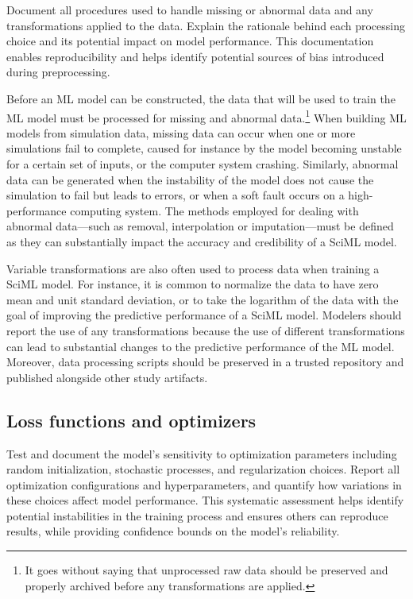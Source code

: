 \begin{essrec}
Document all procedures used to handle missing or abnormal data and any transformations applied to the data. Explain the rationale behind each processing choice and its potential impact on model performance. This documentation enables reproducibility and helps identify potential sources of bias introduced during preprocessing.
\end{essrec}

Before an ML model can be constructed, the data that will be used to train the ML model must be processed for missing and abnormal data.\footnote{It goes without saying that unprocessed raw data should be preserved and properly archived before any transformations are applied.} 
When building ML models from simulation data, missing data can occur when one or more simulations fail to complete, caused for instance by the model becoming unstable for a certain set of inputs, or the computer system crashing. Similarly, abnormal data can be generated when the instability of the model does not cause the simulation to fail but leads to errors, or when a soft fault occurs on a high-performance computing system.
The methods employed for dealing with abnormal data---such as removal, interpolation or imputation---must be defined as they can substantially impact the accuracy and credibility of a SciML model. 

Variable transformations are also often used to process data when training a SciML model. For instance, it is common to normalize the data to have zero mean and unit standard deviation, or to take the logarithm of the data with the goal of improving the predictive performance of a SciML model.
Modelers should report the use of any transformations because the use of different transformations can lead to substantial changes to the predictive performance of the ML model. 
Moreover, data processing scripts should be preserved in a trusted repository and published alongside other study artifacts.



\subsection{Loss functions and optimizers}\label{sec:loss-and-opt}

\begin{essrec}
Test and document the model's sensitivity to optimization parameters including random initialization, stochastic processes, and regularization choices. Report all optimization configurations and hyperparameters, and quantify how variations in these choices affect model performance. This systematic assessment helps identify potential instabilities in the training process and ensures others can reproduce results, while providing confidence bounds on the model's reliability.
\end{essrec}

